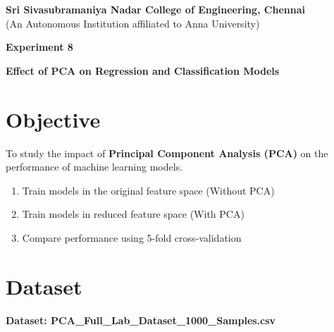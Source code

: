 \documentclass[11pt]{article}
\begin{document}
\begin{center}
    \Large \textbf{Sri Sivasubramaniya Nadar College of Engineering, Chennai} \\
    \large (An Autonomous Institution affiliated to Anna University) \\
    \vspace{0.3cm}
\end{center}

\begin{table}[h!]
\renewcommand{\arraystretch}{1.5}
\centering
{}
\end{table}

\begin{center}
    \textbf{\Large Experiment 8}
\end{center}

\begin{center}
    \textbf{Effect of PCA on Regression and Classification Models}
\end{center}

\section*{Objective}
To study the impact of \textbf{Principal Component Analysis (PCA)} on the performance of machine learning models.
\begin{enumerate}[label=\alph*)]
    \item Train models in the original feature space (Without PCA)
    \item Train models in reduced feature space (With PCA)
    \item Compare performance using 5-fold cross-validation
\end{enumerate}

\section*{Dataset}
\textbf{Dataset: PCA\_Full\_Lab\_Dataset\_1000\_Samples.csv}
\end{document}
